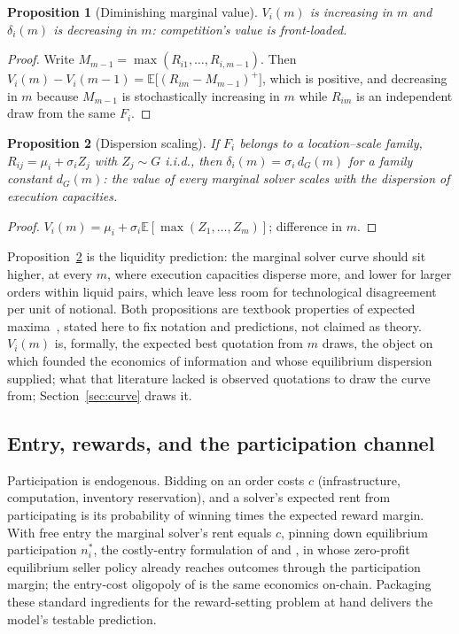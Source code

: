 \documentclass[11pt]{article}
\theoremstyle{plain}
\newtheorem{proposition}{Proposition}
\theoremstyle{definition}
\theoremstyle{remark}
\newcommand{\E}{\mathbb{E}}
\begin{document}
\begin{proposition}[Diminishing marginal value]\label{prop:diminishing}
$V_i(m)$ is increasing in $m$ and $\delta_i(m)$ is decreasing in $m$: competition's value is front-loaded.
\end{proposition}

\begin{proof}
Write $M_{m-1} = \max(R_{i1},\dots,R_{i,m-1})$. Then $V_i(m) - V_i(m-1) = \E\big[(R_{im} - M_{m-1})^+\big]$, which is positive, and decreasing in $m$ because $M_{m-1}$ is stochastically increasing in $m$ while $R_{im}$ is an independent draw from the same $F_i$.
\end{proof}

\begin{proposition}[Dispersion scaling]\label{prop:dispersion}
If $F_i$ belongs to a location--scale family, $R_{ij} = \mu_i + \sigma_i Z_j$ with $Z_j \sim G$ i.i.d., then $\delta_i(m) = \sigma_i\, d_G(m)$ for a family constant $d_G(m)$: the value of every marginal solver scales with the dispersion of execution capacities.
\end{proposition}

\begin{proof}
$V_i(m) = \mu_i + \sigma_i \E[\max(Z_1,\dots,Z_m)]$; difference in $m$.
\end{proof}

Proposition~\ref{prop:dispersion} is the liquidity prediction: the marginal solver curve should sit higher, at every $m$, where execution capacities disperse more, and lower for larger orders within liquid pairs, which leave less room for technological disagreement per unit of notional. Both propositions are textbook properties of expected maxima~\citep{david2003order}, stated here to fix notation and predictions, not claimed as theory. $V_i(m)$ is, formally, the expected best quotation from $m$ draws, the object on which \citet{stigler1961information} founded the economics of information and whose equilibrium dispersion \citet{burdett1983dispersion} supplied; what that literature lacked is observed quotations to draw the curve from; Section~\ref{sec:curve} draws it.

\subsection{Entry, rewards, and the participation channel}\label{sec:model-entry}
Participation is endogenous. Bidding on an order costs $c$ (infrastructure, computation, inventory reservation), and a solver's expected rent from participating is its probability of winning times the expected reward margin. With free entry the marginal solver's rent equals $c$, pinning down equilibrium participation $n^\ast_i$, the costly-entry formulation of \citet{mcafee1987entry} and \citet{levin1994entry}, in whose zero-profit equilibrium seller policy already reaches outcomes through the participation margin; the entry-cost oligopoly of \citet{chitra2024intent} is the same economics on-chain. Packaging these standard ingredients for the reward-setting problem at hand delivers the model's testable prediction.
\end{document}
